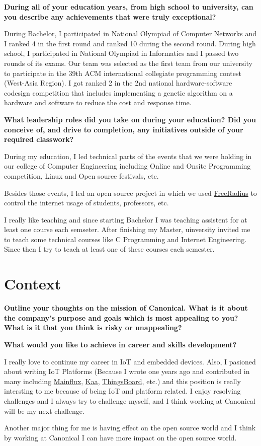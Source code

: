 \noindent
\textbf{During all of your education years, from high school to university, can you describe any achievements that were truly exceptional?}

During Bachelor, I participated in National Olympiad of Computer Networks and I ranked 4 in the first round and ranked
10 during the second round.
During high school, I participated in National Olympiad in Informatics and I passed two rounds of its exams.
Our team was selected as the first team from our university to participate in the 39th ACM international collegiate
programming contest (West-Asia Region).
I got ranked 2 in the 2nd national hardware-software codesign competition that includes implementing a genetic algorithm
on a hardware and software to reduce the cost and response time.

\noindent
\textbf{What leadership roles did you take on during your education?
Did you conceive of, and drive to completion, any initiatives outside of your required classwork?}

During my education, I led technical parts of the events that we were holding in our college of Computer Engineering including
Online and Onsite Programming competition, Linux and Open source festivals, etc.

Besides those events, I led an open source project in which we used \href{https://freeradius.org/}{FreeRadius}
to control the internet usage of students, professors, etc.

I really like teaching and since starting Bachelor I was teaching assistent for at least one course each semseter.
After finishing my Master, uinversity invited me to teach some technical courses like C Programming and
Internet Engineering. Since then I try to teach at least one of these courses each semester.

\section{Context}

\noindent
\textbf{Outline your thoughts on the mission of Canonical. What is it about the company's purpose and goals which is most appealing to you?
What is it that you think is risky or unappealing?}

\noindent
\textbf{What would you like to achieve in career and skills development?}

I really love to continue my career in IoT and embedded devices. Also, I pasioned about writing IoT Platforms
(Because I wrote one years ago and contributed in many including \href{https://github.com/mainflux}{Mainflux},
\href{https://github.com/kaaproject}{Kaa}, \href{https://github.com/thingsboard}{ThingsBoard}, etc.)
and this position is really intersting to me because of being IoT and platform related.
I enjoy resolving challenges and I always try to challenge myself, and I think working at Canonical will be my next challenge.

Another major thing for me is having effect on the open source world and I think by working at Canonical I can
have more impact on the open source world.
